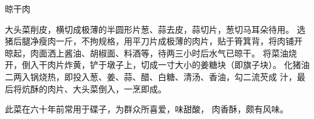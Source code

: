 \begin{recipe}{晾干肉}

\ingredients



\cooking

\step 大头菜削皮，横切成极薄的半圆形片葱、蒜去皮，蒜切片，葱切马耳朵待用。
\step 选猪后腿净瘦肉一斤，不拘规格，用平刀片成极薄的肉片，贴于筲箕背，将肉铺开
晾起，肉面洒上酱油、胡椒面、料酒等，待两三小时后水气已晾干。
\step 将菜油烧开，倒入干肉片炸黄，铲于墩子上，切成一寸大小的姜糖块（即旗子块）。
\step 化猪油二两入锅烧热，即投入葱、姜、蒜、醋、白糖、清汤、香油，勾二流芡成
汁，最后将炕酥的肉片、大头菜倒入，一烹即成。

\notes

此菜在六十年前常用于碟子，为群众所喜爱，味甜酸， 肉香酥，颇有风味。

\end{recipe}

